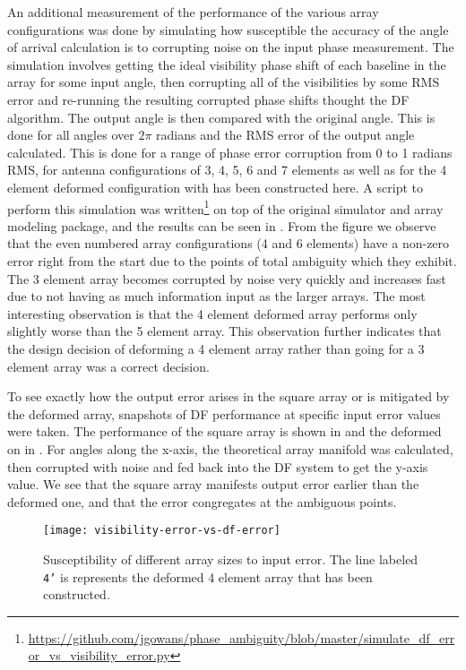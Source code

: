 An additional measurement of the performance of the various array configurations was done by simulating how susceptible the accuracy of the angle of arrival calculation is to corrupting noise on the input phase measurement. The simulation involves getting the ideal visibility phase shift of each baseline in the array for some input angle, then corrupting all of the visibilities by some RMS error and re-running the resulting corrupted phase shifts thought the DF algorithm. The output angle is then compared with the original angle. This is done for all angles over \(2\pi\) radians and the RMS error of the output angle calculated. This is done for a range of phase error corruption from 0 to 1 radians RMS, for antenna configurations of 3, 4, 5, 6 and 7 elements as well as for the 4 element deformed configuration with has been constructed here. A script to perform this simulation was written\footnote{\url{https://github.com/jgowans/phase_ambiguity/blob/master/simulate_df_error_vs_visibility_error.py}} on top of the original simulator and array modeling package, and the results can be seen in . From the figure we observe that the even numbered array configurations (4 and 6 elements) have a non-zero error right from the start due to the points of total ambiguity which they exhibit. The 3 element array becomes corrupted by noise very quickly and increases fast due to not having as much information input as the larger arrays. The most interesting observation is that the 4 element deformed array performs only slightly worse than the 5 element array. This observation further indicates that the design decision of deforming a 4 element array rather than going for a 3 element array was a correct decision.

To see exactly how the output error arises in the square array or is mitigated by the deformed array, snapshots of DF performance at specific input error values were taken. The performance of the square array is shown in  and the deformed on in . For angles along the x-axis, the theoretical array manifold was calculated, then corrupted with noise and fed back into the DF system to get the y-axis value. We see that the square array manifests output error earlier than the deformed one, and that the error congregates at the ambiguous points.

\begin{figure}
  \centering
  \texttt{[image: visibility-error-vs-df-error]}
  \caption{Susceptibility of different array sizes to input error. The line labeled \texttt{4'} is represents the deformed 4 element array that has been constructed.}
  \label{fig:antenna-array:configuration-vs-input-error-vs-output-error}
\end{figure}


